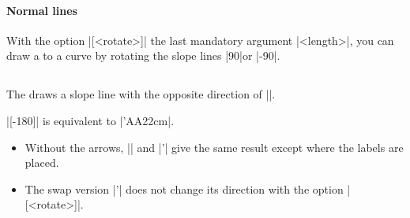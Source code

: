 \paragraph{Normal lines}
With the option |[<rotate>]|  the last mandatory argument |{<length>}|, you can draw a  to a curve by rotating the slope lines |90|\textdegree or |-90|\textdegree.

\begin{tzcode}{.3}
\end{tzcode}


\subsection{\protect{}}
\label{ss:tzslopeat'}

The   draws a slope line with the opposite direction of |\tzslopeat|.

\begin{tzcode}{.3}
\end{tzcode}

\remark 
|[-180]| is equivalent to |\tzslopeat'{AA}{2}{2cm}|.

\begin{itemize}
\item Without the arrows, |\tzslopeat| and |\tzslopeat'| give the same result except where the labels are placed.
\item
The swap version |\tzslopeat'| does not change its direction with the option |[<rotate>]|.
\end{itemize}



